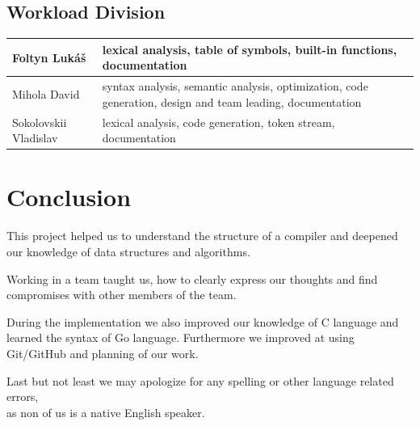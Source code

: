 \documentclass[12pt]{article}
\begin{document}
\subsection{Workload Division}
	\begin{center}
		\begin{tabular}{ | m{10em} | m{29em} |} 
			\hline 
			Foltyn Lukáš &  lexical analysis, table of symbols, built-in functions, documentation\\ 
			\hline
			Mihola David & syntax analysis, semantic analysis, optimization, code generation, design and team leading, documentation\\ 
			\hline
			Sokolovskii Vladislav& lexical analysis, code generation, token stream, documentation\\ 
			\hline
		\end{tabular}
	\end{center}
\section{Conclusion}
This project helped us to understand the structure of a compiler and deepened our knowledge of data structures and algorithms. \par
Working in a team taught us, how to clearly express our thoughts and find compromises with other members of the team.\par
During the implementation we also improved our knowledge of C language and learned the syntax of Go language. Furthermore we improved at using Git/GitHub and planning of our work. \par
Last but not least we may apologize for any spelling or other language related errors,\\as non of us is a native English speaker.
\end{document}
